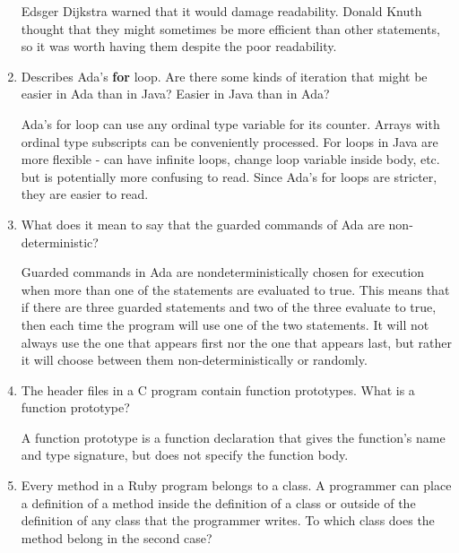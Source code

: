 \begin{enumerate}
    \begin{answer}
    Edsger Dijkstra warned that it would damage readability. Donald Knuth thought that they might sometimes be more efficient than other statements, so it was worth having them despite the poor readability.
    \end{answer}

  \item Describes Ada's \textbf{for} loop. Are there some
    kinds of iteration that might be easier in Ada than
    in Java? Easier in Java than in Ada?

\begin{answer}
        Ada’s for loop can use any ordinal type variable for its counter. Arrays with ordinal type subscripts can be conveniently processed. For loops in Java are more flexible - can have infinite loops, change loop variable inside body, etc. but is potentially more confusing to read. Since Ada's for loops are stricter, they are easier to read.

    \end{answer}
    
  \item What does it mean to say that the guarded commands
    of Ada are non-deterministic?
    
    \begin{answer}
    Guarded commands in Ada are nondeterministically chosen for execution when more than one of the statements are evaluated to true. This means that if there are three guarded statements and two of the three evaluate to true, then each time the program will use one of the two statements. It will not always use the one that appears first nor the one that appears last, but rather it will choose between them non-deterministically or randomly.
    \end{answer}

  \item The header files in a C program contain function
    prototypes. What is a function prototype?
    
    \begin{answer}
    	A function prototype is a function declaration that gives the function's name and type signature, but does not specify the function body. 
    \end{answer}

  \item Every method in a Ruby program belongs to a class.
    A programmer can place a definition of a method inside
    the definition of a class or outside of the definition
    of any class that the programmer writes. To which class
    does the method belong in the second case?


\end{enumerate}
